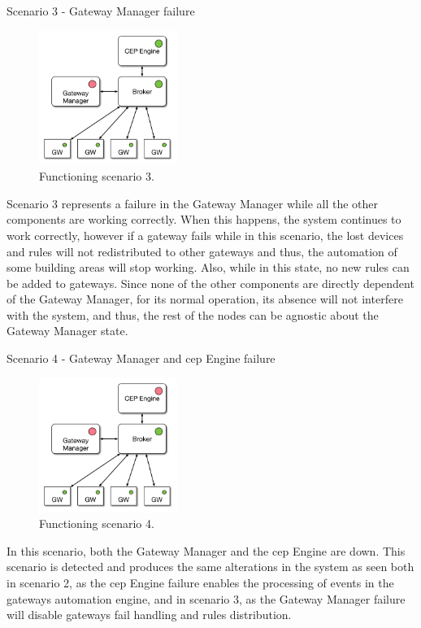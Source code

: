 \begin{Paragraph}{Scenario 3 - Gateway Manager failure}
	\begin{figure}[H]
		\centering
		\includegraphics[width=0.4\textwidth]{figures/fs5.png}
		\caption{Functioning scenario 3.}
		\label{fig:fs5}
	\end{figure}

Scenario 3 represents a failure in the Gateway Manager while all the other components are working correctly. When this happens, the system continues to work correctly, however if a gateway fails while in this scenario, the lost devices and rules will not redistributed to other gateways and thus, the automation of some building areas will stop working. Also, while in this state, no new rules can be added to gateways. Since none of the other components are directly dependent of the Gateway Manager, for its normal operation, its absence will not interfere with the system, and thus, the rest of the nodes can be agnostic about the Gateway Manager state.


\end{Paragraph}



\begin{Paragraph}{Scenario 4 - Gateway Manager and \ac{cep} Engine failure}
\begin{figure}[H]
	\centering
	\includegraphics[width=0.4\textwidth]{figures/fs4.png}
	\caption{Functioning scenario 4.}
	\label{fig:fs4}
\end{figure}

In this scenario, both the Gateway Manager and the \ac{cep} Engine are down. This scenario is detected and produces the same alterations in the system as seen both in scenario 2, as the \ac{cep} Engine failure enables the processing of events in the gateways automation engine, and in scenario 3, as the Gateway Manager failure will disable gateways fail handling and rules distribution.



\end{Paragraph}


